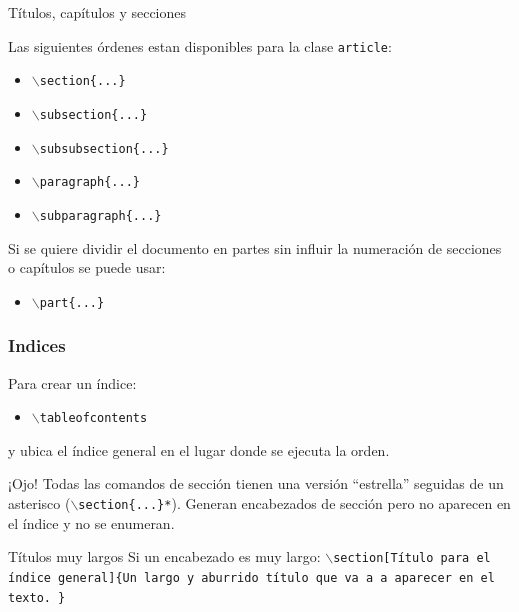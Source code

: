     \begin{frame}{T\'itulos, cap\'itulos y secciones}

        Las siguientes \'ordenes estan disponibles para la clase \texttt{article}: \\
        \begin{itemize}
            \item \texttt{$\backslash$section\{...\}} \\
            \item \texttt{$\backslash$subsection\{...\}} \\
            \item \texttt{$\backslash$subsubsection\{...\}} \\
            \item \texttt{$\backslash$paragraph\{...\}} \\
            \item \texttt{$\backslash$subparagraph\{...\}}
        \end{itemize}
        Si se quiere dividir el documento en partes sin influir la numeraci\'on de secciones o capítulos se puede usar:
        \begin{itemize}
            \item \texttt{$\backslash$part\{...\}}
        \end{itemize}
    \end{frame}

    \begin{frame}
        \frametitle{Indices}
        Para crear un \'indice:
        \begin{itemize}
            \item \texttt{$\backslash$tableofcontents}
        \end{itemize}
        y ubica el índice general en el lugar donde se ejecuta la orden.

        \begin{alertblock}{¡Ojo!}
            Todas las comandos de secci\'on tienen una versi\'on ``estrella'' seguidas de un asterisco (\texttt{$\backslash$section\{...\}*}).
                Generan encabezados de secci\'on pero no aparecen en el \'indice y no se enumeran.
        \end{alertblock}

        \begin{alertblock}{Títulos muy largos}
            Si un encabezado es muy largo:
            \texttt{$\backslash$section[T\'itulo para el \'indice general]\{Un largo y aburrido t\'itulo que va a a aparecer en el texto. \}}
        \end{alertblock}

    \end{frame}

